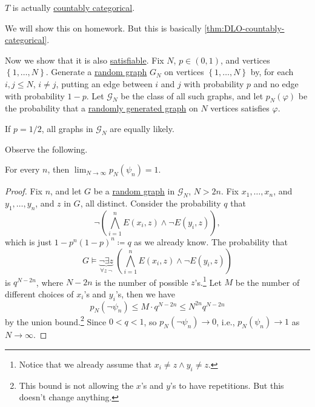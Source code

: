 \begin{remark}
	\(T\) is actually \hyperref[def:countably-categorical]{countably categorical}.
\end{remark}
\begin{explanation}
	We will show this on homework. But this is basically \autoref{thm:DLO-countably-categorical}.
\end{explanation}

Now we show that it is also \hyperref[def:satisfiable]{satisfiable}. Fix \(N\), \(p\in (0, 1)\), and vertices \(\left\{ 1, \ldots , N \right\} \). Generate a \hyperref[def:random-graph]{random graph} \(G_N\) on vertices \(\left\{ 1, \ldots , N \right\} \) by, for each \(i, j \leq N\), \(i \neq j\), putting an edge between \(i\) and \(j\) with probability \(p\) and no edge with probability \(1 - p\). Let \(\mathcal{G} _N\) be the class of all such graphs, and let \(p_N(\varphi )\) be the probability that a \hyperref[def:random-graph]{randomly generated graph} on \(N\) vertices satisfies \(\varphi \).

\begin{eg}
	If \(p = 1 / 2\), all graphs in \(\mathcal{G} _N\) are equally likely.
\end{eg}

Observe the following.

\begin{proposition}\label{prop:random-graph-almost-surely-satisfiable}
	For every \(n\), then \(\lim_{N \to \infty} p_N(\psi _n) = 1\).
\end{proposition}
\begin{proof}
	Fix \(n\), and let \(G\) be a \hyperref[def:random-graph]{random graph} in \(\mathcal{G} _N\), \(N > 2n\). Fix \(x_1, \ldots , x_n\), and \(y_1, \ldots , y_n\), and \(z\) in \(G\), all distinct. Consider the probability \(q\) that
	\[
		\lnot \left( \bigwedge_{i=1}^{n} E(x_i, z) \land \lnot E(y_i, z)\right),
	\]
	which is just \(1 - p^n (1-p)^n \coloneqq q\) as we already know. The probability that
	\[
		G \models \underbrace{\lnot \exists z}_{\forall z\ \lnot }\ \left( \bigwedge_{i=1}^{n} E(x_i, z) \land \lnot E(y_i, z) \right)
	\]
	is \(q^{N-2n}\), where \(N-2n\) is the number of possible \(z\)'s.\footnote{Notice that we already assume that \( x_i \neq z \land y_i \neq z\).} Let \(M\) be the number of different choices of \(x_i\)'s and \(y_i\)'s, then we have
	\[
		p_N(\lnot \psi _n)
		\leq M\cdot q^{N - 2n}
		\leq N^{2n} q^{N-2n}
	\]
	by the union bound.\footnote{This bound is not allowing the \(x\)'s and \(y\)'s to have repetitions. But this doesn't change anything.} Since \(0 < q < 1\), so \(p_N (\lnot \psi _n) \to 0\), i.e., \(p_N(\psi _n) \to 1\) as \(N \to \infty \).
\end{proof}


